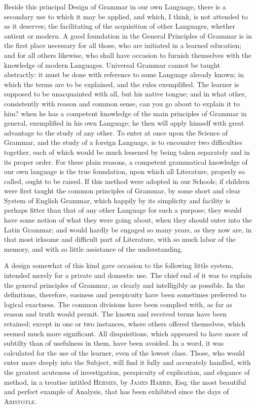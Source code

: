 Beside this principal Design of Grammar in our own Language, there is a
secondary use to which it may be applied, and which, I think, is not
attended to as it deserves; the facilitating of the acquisition of other
Languages, whether antient or modern. A good foundation in the General
Principles of Grammar is in the first place necessary for all those, who
are initiated in a learned education; and for all others likewise, who
shall have occasion to furnish themselves with the knowledge of modern
Languages. Universal Grammar cannot be taught abstractly: it must be
done with reference to some Language already known; in which the terms
are to be explained, and the rules exemplified. The learner is supposed
to be unacquainted with all, but his native tongue; and in what other,
consistently with reason and common sense, can you go about to explain
it to him? when he has a competent knowledge of the main principles of
Grammar in general, exemplified in his own Language; he then will apply
himself with great advantage to the study of any other. To enter at once
upon the Science of Grammar, and the study of a foreign Language, is to
encounter two difficulties together, each of which would be much
lessened by being taken separately and in its proper order. For these
plain reasons, a competent grammatical knowledge of our own language is
the true foundation, upon which all Literature, properly so called,
ought to be raised. If this method were adopted in our Schools; if
children were first taught the common principles of Grammar, by some
short and clear System of English Grammar, which happily by its
simplicity and facility is perhaps fitter than that of any other
Language for such a purpose; they would have some notion of what they
were going about, when they should enter into the Latin Grammar; and
would hardly be engaged so many years, as they now are, in that most
irksome and difficult part of Literature, with so much labor of the
memory, and with so little assistance of the understanding.

A design somewhat of this kind gave occasion to the following little
system, intended merely for a private and domestic use. The chief end of
it was to explain the general principles of Grammar, as clearly and
intelligibly as possible. In the definitions, therefore, easiness and
perspicuity have been sometimes preferred to logical exactness. The
common divisions have been complied with, as far as reason and truth
would permit. The known and received terms have been retained; except in
one or two instances, where others offered themselves, which seemed much
more significant. All disquisitions, which appeared to have more of
subtilty than of usefulness in them, have been avoided. In a word, it
was calculated for the use of the learner, even of the lowest class.
Those, who would enter more deeply into the Subject, will find it fully
and accurately handled, with the greatest acuteness of investigation,
perspicuity of explication, and elegance of method, in a treatise
intitled \textsc{Hermes}, by \textsc{James Harris}, Esq; the most
beautiful and perfect example of Analysis, that has been exhibited since
the days of \textsc{Aristotle}.

